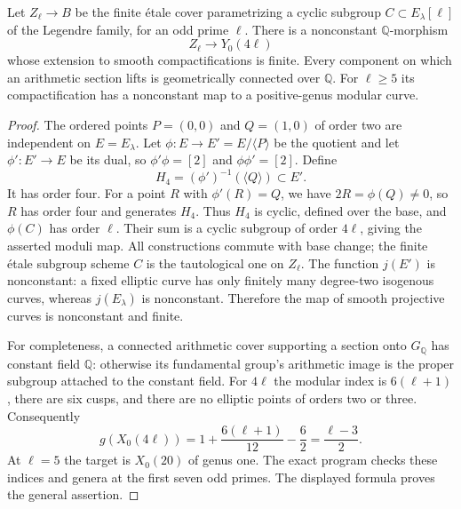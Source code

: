 \begin{proposition}
\label{E-level-four}
Let $Z_\ell\to B$ be the finite étale cover parametrizing
a cyclic subgroup $C\subset E_\lambda[\ell]$ of the
Legendre family, for an odd prime $\ell$. There is
a nonconstant $\mathbb Q$-morphism
\[
 Z_\ell\longrightarrow Y_0(4\ell)
\]
whose extension to smooth compactifications is finite.
Every component on which an arithmetic section lifts
is geometrically connected over $\mathbb Q$.
For $\ell\geq5$ its compactification has a
nonconstant map to a positive-genus modular curve.
\end{proposition}
\begin{proof}
The ordered points $P=(0,0)$ and $Q=(1,0)$ of order
two are independent on $E=E_\lambda$.
Let $\phi:E\to E'=E/\langle P\rangle$ be the quotient
and let $\phi':E'\to E$ be its dual, so
$\phi'\phi=[2]$ and $\phi\phi'=[2]$.
Define
\[
 H_4=(\phi')^{-1}(\langle Q\rangle)\subset E'.
\]
It has order four. For a point $R$ with
$\phi'(R)=Q$, we have $2R=\phi(Q)\ne0$,
so $R$ has order four and generates $H_4$.
Thus $H_4$ is cyclic, defined over the base, and
$\phi(C)$ has order $\ell$. Their sum is a cyclic
subgroup of order $4\ell$, giving the asserted
moduli map. All constructions commute with
base change; the finite étale subgroup scheme
$C$ is the tautological one on $Z_\ell$.
The function $j(E')$ is nonconstant: a fixed elliptic
curve has only finitely many degree-two isogenous
curves, whereas $j(E_\lambda)$ is nonconstant.
Therefore the map of smooth projective curves
is nonconstant and finite.

For completeness, a connected arithmetic cover
supporting a section onto $G_{\mathbb Q}$ has
constant field $\mathbb Q$: otherwise its
fundamental group's arithmetic image is the
proper subgroup attached to the constant field.
For $4\ell$ the modular index is $6(\ell+1)$,
there are six cusps, and there are no elliptic
points of orders two or three. Consequently
\[
 g(X_0(4\ell))=1+\frac{6(\ell+1)}{12}-\frac62
             =\frac{\ell-3}{2}.
\]
At $\ell=5$ the target is $X_0(20)$ of genus one.
The exact program checks these indices and genera
at the first seven odd primes. The displayed
formula proves the general assertion.
\end{proof}

